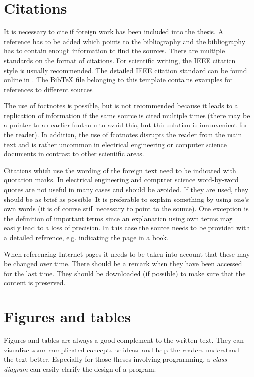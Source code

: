 \section{Citations} \label{sec_citations}

It is necessary to cite if foreign work has been included into the thesis. A reference has to be added which points to the bibliography and the bibliography has to contain enough information to find the sources. There are multiple standards on the format of citations. For scientific writing, the IEEE citation style is usually recommended. The detailed IEEE citation standard can be found online in \cite{ieeecitation09}. The BibTeX file belonging to this template contains examples for references to different sources.

The use of footnotes is possible, but is not recommended because it leads to a replication of information if the same source is cited multiple times (there may be a pointer to an earlier footnote to avoid this, but this solution is inconvenient for the reader). In addition, the use of footnotes disrupts the reader from the main text and is rather uncommon in electrical engineering or computer science documents in contrast to other scientific areas. 

Citations which use the wording of the foreign text need to be indicated with quotation marks. In electrical engineering and computer science word-by-word quotes are not useful in many cases and should be avoided. If they are used, they should be as brief as possible. It is preferable to explain something by using one's own words (it is of course still necessary to point to the source). One exception is the definition of important terms since an explanation using own terms may easily lead to a loss of precision. In this case the source needs to be provided with a detailed reference, e.g. indicating the page in a book.
 
When referencing Internet pages it needs to be taken into account that these may be changed over time. There should be a remark when they have been accessed for the last time. They should be downloaded (if possible) to make sure that the content is preserved.

\section{Figures and tables}

Figures and tables are always a good complement to the written text. They can visualize some complicated concepts or ideas, and help the readers understand the text better. Especially for those theses involving programming, a \textit{class diagram} can easily clarify the design of a program.


